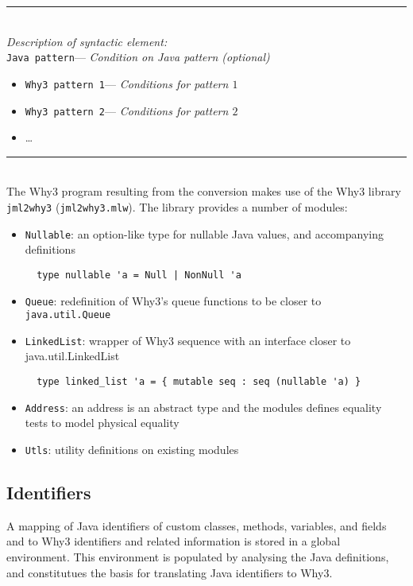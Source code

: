 \documentclass[a4paper]{report}
\newcommand{\jmlwhyheading}[1]{\emph{#1:}}
\newcommand{\jmlwhycomment}[1]{\hfill{\footnotesize--- \emph{#1}}}
\begin{document}
\noindent\rule{\textwidth}{1pt}\\
\noindent\jmlwhyheading{Description of syntactic element}\\
\lstinline^Java pattern^\jmlwhycomment{Condition on Java pattern (optional)}
\begin{itemize}
\item \lstinline^Why3 pattern 1^\jmlwhycomment{Conditions for pattern $1$}
\item \lstinline^Why3 pattern 2^\jmlwhycomment{Conditions for pattern $2$}
\item \ldots
\end{itemize}
\noindent\rule{\textwidth}{1pt}\\

The Why3 program resulting from the conversion makes use of the Why3 library
\texttt{jml2why3} (\texttt{jml2why3.mlw}). The library provides a number of
modules:
\begin{itemize}
\item \texttt{Nullable}: an option-like type for nullable Java values, and
  accompanying definitions
\begin{lstlisting}
  type nullable 'a = Null | NonNull 'a
\end{lstlisting}
\item \texttt{Queue}: redefinition of Why3's queue functions to be closer to \texttt{java.util.Queue}
\item \texttt{LinkedList}: wrapper of Why3 sequence with an interface closer to java.util.LinkedList
\begin{lstlisting}
  type linked_list 'a = { mutable seq : seq (nullable 'a) }
\end{lstlisting}
\item \texttt{Address}: an address is an abstract type and the modules defines
  equality tests to model physical equality
\item \texttt{Utls}: utility definitions on existing modules
\end{itemize}

\subsection{Identifiers}

A mapping of Java identifiers of custom classes, methods, variables, and fields
and to Why3 identifiers and related information is stored in a global
environment. This environment is populated by analysing the Java definitions,
and constitutues the basis for translating Java identifiers to Why3.
\end{document}
